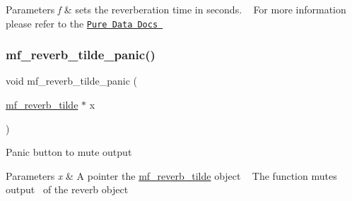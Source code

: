 \begin{DoxyParams}{Parameters}
{\em f} & sets the reverberation time in seconds. ~\newline
 For more information please refer to the \href{https://github.com/pure-data/externals-howto}{\tt Pure Data Docs } ~\newline
 \\
\hline
\end{DoxyParams}
\mbox{\label{structmf__reverb__tilde_a61d1ad50d068104d1291bc8ae8c6a8e6}} 
\subsubsection{\texorpdfstring{mf\+\_\+reverb\+\_\+tilde\+\_\+panic()}{mf\_reverb\_tilde\_panic()}}
{\footnotesize\ttfamily void mf\+\_\+reverb\+\_\+tilde\+\_\+panic (\begin{DoxyParamCaption}\item[{\mbox{\hyperlink{structmf__reverb__tilde}{mf\+\_\+reverb\+\_\+tilde}} $\ast$}]{x }\end{DoxyParamCaption})\hspace{0.3cm}{\ttfamily [related]}}



Panic button to mute output~\newline
 


\begin{DoxyParams}{Parameters}
{\em x} & A pointer the \mbox{\hyperlink{structmf__reverb__tilde}{mf\+\_\+reverb\+\_\+tilde}} object ~\newline
 The function mutes output~\newline
 of the reverb object \\
\hline
\end{DoxyParams}
\mbox{\label{structmf__reverb__tilde_a408c614805a7e4e145d66cfa69c780a0}} 
